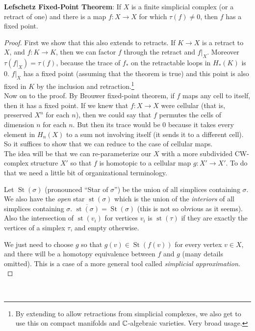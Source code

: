 \documentclass{amsart}
\DeclareMathOperator{\St}{St}
\DeclareMathOperator{\st}{st}
\begin{document}
	\textbf{Lefschetz Fixed-Point Theorem}: If $X$ is a finite simplicial complex (or a retract of one) and there is a map $f:X\to X$ for which $\tau(f)\neq 0$, then $f$ has a fixed point.
	\begin{proof}
		First we show that this also extends to retracts. If $K\to X$ is a retract to $X$, and $f:K\to K$, then we can factor $f$ through the retract and $f|_X$. Moreover $\tau(f|_X)=\tau(f)$, because the trace of $f_*$ on the retractable loops in $H_*(K)$ is 0. $f|_X$ has a fixed point (assuming that the theorem is true) and this point is also fixed in $K$ by the inclusion and retraction.\footnote{By extending to allow retractions from simplicial complexes, we also get to use this on compact manifolds and $\mathbb{C}$-algebraic varieties. Very broad usage.}\\
		
		Now on to the proof. By Brouwer fixed-point theorem, if $f$ maps any cell to itself, then it has a fixed point. If we knew that $f:X\to X$ were cellular (that is, preserved $X^n$ for each $n$), then we could say that $f$ permutes the cells of dimension $n$ for each $n$. But then its trace would be 0 because it takes every element in $H_n(X)$ to a sum not involving itself (it sends it to a different cell). So it suffices to show that we can reduce to the case of cellular maps.\\
		
		The idea will be that we can re-parameterize our $X$ with a more subdivided CW-complex structure $X'$ so that $f$ is homotopic to a cellular map $g:X'\to X'$. To do that we need a little bit of organizational terminology.
		
		Let $\St(\sigma)$ (pronounced ``Star of $\sigma$'') be the union of all simplices containing $\sigma$. We also have the \textit{open} star $\st(\sigma)$ which is the union of the \textit{interiors} of all simplices containing $\sigma$. $\overline{\st(\sigma)}=\St(\sigma)$ (this is not so obvious as it seems). Also the intersection of $\st(v_i)$ for vertices $v_i$ is $\st(\tau)$ if they are exactly the vertices of a simplex $\tau$, and empty otherwise.
		
		We just need to choose $g$ so that $g(v) \in \St(f(v))$ for every vertex $v\in X$, and there will be a homotopy equivalence between $f$ and $g$ (many details omitted). This is a case of a more general tool called \textit{simplicial approximation}.\\
		
	\end{proof}\\
	
\end{document}
